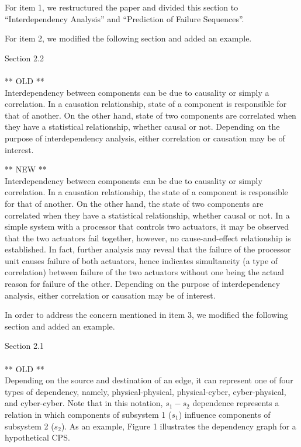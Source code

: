 \documentclass{article}
\newenvironment{response}{
  \doublespacing
  \setlength\parindent{0.05\linewidth}
  \ttfamily
}{}
\newenvironment{textblock}[1]
{\begin{tcolorbox}[breakable,enhanced]{#1 \\ \\}}
{\end{tcolorbox}}
\begin{document}
\begin{response}
For item 1, we restructured the paper and divided this section to ``Interdependency Analysis'' and ``Prediction of Failure Sequences''.

For item 2, we modified the following section and added an example.

\begin{textblock}{Section 2.2}
** OLD **\\
Interdependency between components can be due to causality or simply a correlation. In a causation relationship, state of a component is responsible for that of another. On the other hand, state of two components are correlated when they have a statistical relationship, whether causal or not. Depending on the purpose of interdependency analysis, either correlation or causation may be of interest.

\vspace{1em}
** NEW **\\
Interdependency between components can be due to causality or simply correlation. In a causation relationship, the state of a component is responsible for that of another. On the other hand, the state of two components are correlated when they have a statistical relationship, whether causal or not. In a simple system with a processor that controls two actuators, it may be observed that the two actuators fail together, however, no cause-and-effect relationship is established. In fact, further analysis may reveal that the failure of the processor unit causes failure of both actuators, hence indicates simultaneity (a type of correlation) between failure of the two actuators without one being the actual reason for failure of the other. Depending on the purpose of interdependency analysis, either correlation or causation may be of interest.
\end{textblock}

In order to address the concern mentioned in item 3, we modified the following section and added an example.

\begin{textblock}{Section 2.1}
** OLD **\\
Depending on the source and destination of an edge, it can represent one of four types of dependency, namely, physical-physical, physical-cyber,
cyber-physical, and cyber-cyber. Note that in this notation, $s_1-s_2$ dependence represents a relation in which components of subsystem 1 ($s_1$) influence components of subsystem 2 ($s_2$). As an example, Figure 1 illustrates the dependency graph for a hypothetical CPS.


\end{textblock}
\end{response}
\end{document}
